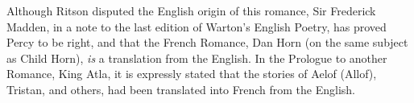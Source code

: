 Although Ritson disputed the English origin of this romance, Sir Frederick
Madden, in a note to the last edition of Warton’s English Poetry, has proved
Percy to be right, and that the French Romance, Dan Horn (on the same subject
as Child Horn), \textit{is} a translation from the English. In the Prologue to another
Romance, King Atla, it is expressly stated that the stories of Aelof (Allof),
Tristan, and others, had been translated into French from the English. 

\pagebreak